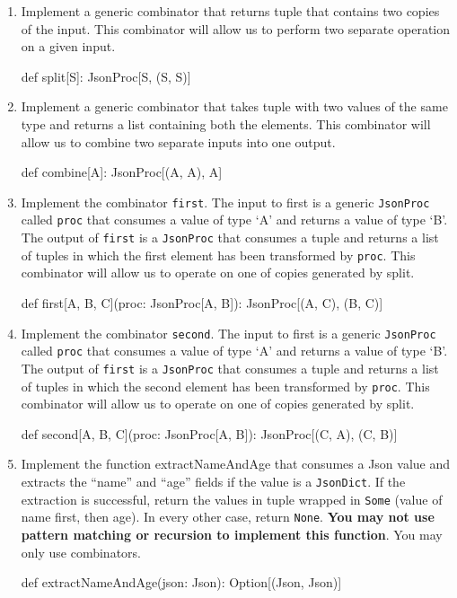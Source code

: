 \begin{enumerate}
    \item Implement a generic combinator that returns tuple that contains
    two copies of the input. This combinator will allow us to perform two
    separate operation on a given input.
    \begin{scalacode}
    def split[S]: JsonProc[S, (S, S)]
    \end{scalacode}

    \item Implement a generic combinator that takes tuple with two values
    of the same type and returns a list containing both the elements. This
    combinator will allow us to combine two separate inputs into one output.
    \begin{scalacode}
    def combine[A]: JsonProc[(A, A), A]
    \end{scalacode}

    \item Implement the combinator \texttt{first}. The input to first is a
    generic \texttt{JsonProc} called \texttt{proc} that consumes a value of
    type `A' and returns a value of type `B'. The output of \texttt{first} is
    a \texttt{JsonProc} that consumes a tuple and returns a list of tuples in
    which the first element has been transformed by \texttt{proc}. This
    combinator will allow us to operate on one of copies generated by split.
    \begin{scalacode}
    def first[A, B, C](proc: JsonProc[A, B]): JsonProc[(A, C), (B, C)]
    \end{scalacode}

    \item Implement the combinator \texttt{second}. The input to first is a
    generic \texttt{JsonProc} called \texttt{proc} that consumes a value of
    type `A' and returns a value of type `B'. The output of \texttt{first} is
    a \texttt{JsonProc} that consumes a tuple and returns a list of tuples in
    which the second element has been transformed by \texttt{proc}. This
    combinator will allow us to operate on one of copies generated by split.
    \begin{scalacode}
    def second[A, B, C](proc: JsonProc[A, B]): JsonProc[(C, A), (C, B)]
    \end{scalacode}

    \item Implement the function extractNameAndAge that consumes a Json value
    and extracts the ``name'' and ``age'' fields if the value is a
    \texttt{JsonDict}. If the extraction is successful, return the values in
    tuple wrapped in \texttt{Some} (value of name first, then age). In every
    other case, return \texttt{None}. \textbf{You may not use pattern
    matching or recursion to implement this function}. You may only use
    combinators.
    \begin{scalacode}
    def extractNameAndAge(json: Json): Option[(Json, Json)]
    \end{scalacode}


\end{enumerate}
